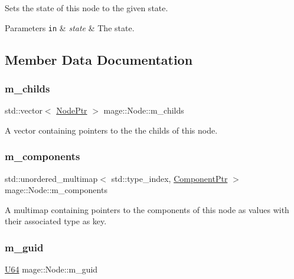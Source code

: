 Sets the state of this node to the given state.


\begin{DoxyParams}[1]{Parameters}
\mbox{\tt in}  & {\em state} & The state. \\
\hline
\end{DoxyParams}


\subsection{Member Data Documentation}
\hypertarget{classmage_1_1_node_a1d1d432f46c61932b5167d27d20cc383}{}\label{classmage_1_1_node_a1d1d432f46c61932b5167d27d20cc383} 
\subsubsection{\texorpdfstring{m\+\_\+childs}{m\_childs}}
{\footnotesize\ttfamily std\+::vector$<$ \hyperlink{classmage_1_1_node_ac575dc006e0ae1134277ade977dc06b6}{Node\+Ptr} $>$ mage\+::\+Node\+::m\+\_\+childs\hspace{0.3cm}{\ttfamily [private]}}

A vector containing pointers to the the childs of this node. \hypertarget{classmage_1_1_node_a804d53398f193b6b06f883131ab7415d}{}\label{classmage_1_1_node_a804d53398f193b6b06f883131ab7415d} 
\subsubsection{\texorpdfstring{m\+\_\+components}{m\_components}}
{\footnotesize\ttfamily std\+::unordered\+\_\+multimap$<$ std\+::type\+\_\+index, \hyperlink{classmage_1_1_node_a46b7e1f4f5b98bfa78ed96a80797a4ba}{Component\+Ptr} $>$ mage\+::\+Node\+::m\+\_\+components\hspace{0.3cm}{\ttfamily [private]}}

A multimap containing pointers to the components of this node as values with their associated type as key. \hypertarget{classmage_1_1_node_a3ef1876293074bfcc01104eb92f1bfdf}{}\label{classmage_1_1_node_a3ef1876293074bfcc01104eb92f1bfdf} 
\subsubsection{\texorpdfstring{m\+\_\+guid}{m\_guid}}
{\footnotesize\ttfamily \hyperlink{namespacemage_a6672cf3c861707ce4a3235a3eb43941d}{U64} mage\+::\+Node\+::m\+\_\+guid\hspace{0.3cm}{\ttfamily [private]}}

